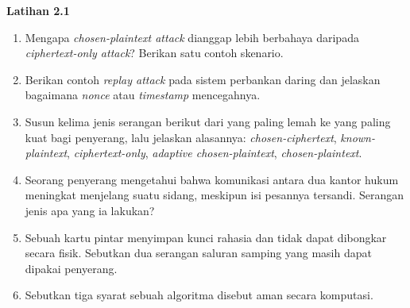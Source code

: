 \begin{obereflection}
\textbf{Latihan 2.1}
\begin{enumerate}
    \item Mengapa \textit{chosen-plaintext attack} dianggap lebih berbahaya
          daripada \textit{ciphertext-only attack}? Berikan satu contoh skenario.
    \item Berikan contoh \textit{replay attack} pada sistem perbankan daring dan
          jelaskan bagaimana \textit{nonce} atau \textit{timestamp} mencegahnya.
    \item Susun kelima jenis serangan berikut dari yang paling lemah ke yang
          paling kuat bagi penyerang, lalu jelaskan alasannya:
          \textit{chosen-ciphertext}, \textit{known-plaintext},
          \textit{ciphertext-only}, \textit{adaptive chosen-plaintext},
          \textit{chosen-plaintext}.
    \item Seorang penyerang mengetahui bahwa komunikasi antara dua kantor hukum
          meningkat menjelang suatu sidang, meskipun isi pesannya tersandi.
          Serangan jenis apa yang ia lakukan?
    \item Sebuah kartu pintar menyimpan kunci rahasia dan tidak dapat dibongkar
          secara fisik. Sebutkan dua serangan saluran samping yang masih dapat
          dipakai penyerang.
    \item Sebutkan tiga syarat sebuah algoritma disebut aman secara komputasi.
\end{enumerate}
\end{obereflection}
